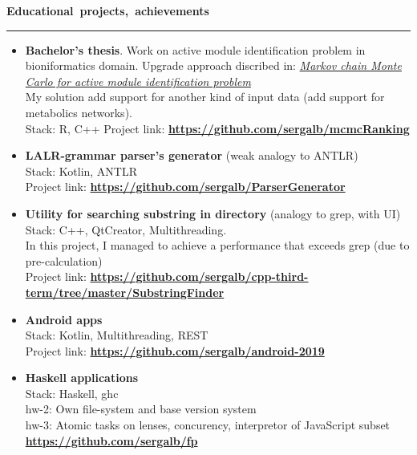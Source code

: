 \documentclass[10pt, a4paper]{report}
\begin{document}
    \par\hbox{\large\textbf{Educational projects, achievements}}\kern5pt\hrule\kern5pt
    \begin{itemize}
    
        \item \textbf{Bachelor's thesis}. Work on active module identification problem in bioniformatics domain. Upgrade approach discribed in: \href{https://bmcbioinformatics.biomedcentral.com/articles/10.1186/s12859-020-03572-9}{\textit{Markov chain Monte Carlo for active module identification problem}}\\
        My solution add support for another kind of input data (add support for metabolics networks).\\
        Stack: R, C++
        Project link:
        \textbf{
        \url{https://github.com/sergalb/mcmcRanking}
        }
        

        \item \textbf{LALR-grammar parser's generator} (weak analogy to  ANTLR)\\
        Stack: Kotlin, ANTLR\\
        Project link:
        \textbf{
        \url{https://github.com/sergalb/ParserGenerator}
        }

        \item \textbf{Utility for searching substring in directory} (analogy to grep, with UI)\\
        Stack: C++, QtCreator, Multithreading.\\
        In this project, I managed to achieve a performance that exceeds grep (due to pre-calculation)\\
        Project link:
        \textbf{
        \url{https://github.com/sergalb/cpp-third-term/tree/master/SubstringFinder}
        }

        \item \textbf{Android apps}\\
        Stack: Kotlin, Multithreading, REST\\
        Project link:
        \textbf{
        \url{https://github.com/sergalb/android-2019}
        }

        \item \textbf{Haskell applications}\\
        Stack: Haskell, ghc \\
        hw-2: Own file-system and base version system\\
        hw-3: Atomic tasks on lenses, concurency, interpretor of JavaScript subset\\
        \textbf{
        \url{https://github.com/sergalb/fp}
        }


\end{itemize}
\end{document}
